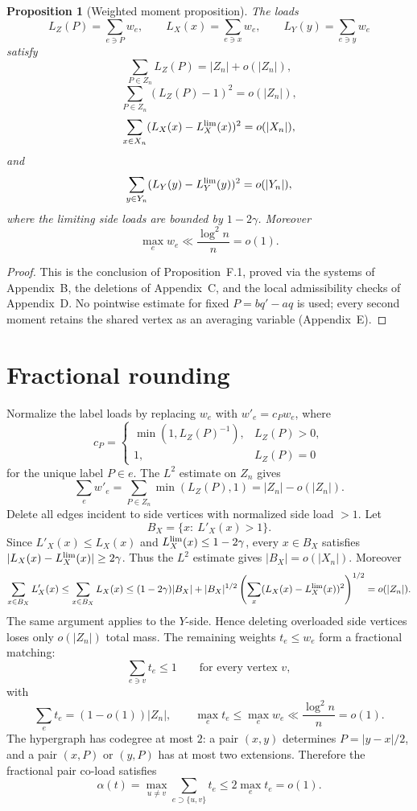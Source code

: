 \documentclass[11pt]{article}
\newtheorem{proposition}[theorem]{Proposition}
\begin{document}
\begin{proposition}[Weighted moment proposition]
The loads
\[
  L_Z(P)=\sum_{e\ni P}w_e,\qquad
  L_X(x)=\sum_{e\ni x}w_e,\qquad
  L_Y(y)=\sum_{e\ni y}w_e
\]
satisfy
\[
  \sum_{P\in Z_n}L_Z(P)=|Z_n|+o(|Z_n|),
\]
\[
  \sum_{P\in Z_n}(L_Z(P)-1)^2=o(|Z_n|),
\]
\[
  \sum_{x\in X_n}(L_X(x)-L_X^{\rm lim}(x))^2=o(|X_n|),
\]
and
\[
  \sum_{y\in Y_n}(L_Y(y)-L_Y^{\rm lim}(y))^2=o(|Y_n|),
\]
where the limiting side loads are bounded by \(1-2\gamma\).  Moreover
\[
  \max_e w_e\ll \frac{\log^2 n}{n}=o(1).
\]
\end{proposition}

\begin{proof}
This is the conclusion of Proposition~F.1, proved via the systems of
Appendix~B, the deletions of Appendix~C, and the local admissibility checks
of Appendix~D.  No pointwise estimate for fixed \(P=bq'-aq\) is used; every
second moment retains the shared vertex as an averaging variable
(Appendix~E).
\end{proof}

\section{Fractional rounding}

Normalize the label loads by replacing \(w_e\) with \(w'_e=c_Pw_e\), where
\[
  c_P=
  \begin{cases}
    \min(1,L_Z(P)^{-1}),& L_Z(P)>0,\\
    1,& L_Z(P)=0
  \end{cases}
\]
for the unique label \(P\in e\).  The \(L^2\) estimate on \(Z_n\) gives
\[
  \sum_e w'_e=\sum_{P\in Z_n}\min(L_Z(P),1)=|Z_n|-o(|Z_n|).
\]
Delete all edges incident to side vertices with normalized side load \(>1\).
Let
\[
  B_X=\{x:\ L'_X(x)>1\}.
\]
Since \(L'_X(x)\le L_X(x)\) and \(L_X^{\rm lim}(x)\le1-2\gamma\), every
\(x\in B_X\) satisfies
\(|L_X(x)-L_X^{\rm lim}(x)|\ge 2\gamma\).  Thus the \(L^2\) estimate gives
\(|B_X|=o(|X_n|)\).  Moreover
\[
  \sum_{x\in B_X}L'_X(x)\le \sum_{x\in B_X}L_X(x)
  \le (1-2\gamma)|B_X|
  + |B_X|^{1/2}
    \left(\sum_x (L_X(x)-L_X^{\rm lim}(x))^2\right)^{1/2}
  =o(|Z_n|).
\]
The same argument applies to the \(Y\)-side.  Hence deleting overloaded side
vertices loses only \(o(|Z_n|)\) total mass.  The remaining weights
\(t_e\le w_e\) form a fractional matching:
\[
  \sum_{e\ni v}t_e\le1\qquad\text{for every vertex }v,
\]
with
\[
  \sum_e t_e=(1-o(1))|Z_n|,\qquad
  \max_e t_e\le\max_e w_e\ll \frac{\log^2 n}{n}=o(1).
\]
The hypergraph has codegree at most \(2\): a pair \((x,y)\) determines
\(P=|y-x|/2\), and a pair \((x,P)\) or \((y,P)\) has at most two extensions.
Therefore the fractional pair co-load satisfies
\[
  \alpha(t)=\max_{u\ne v}\sum_{e\supset\{u,v\}}t_e
  \le2\max_e t_e=o(1).
\]
\end{document}
